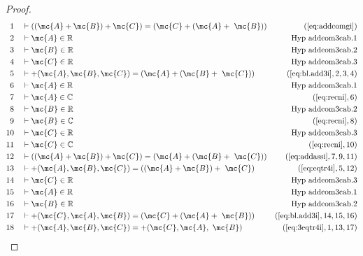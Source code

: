 \begin{proof}
\begin{align}
  1 &&  & \vdash ( ( \mc{A} + \mc{B} ) + \mc{C} ) = ( \mc{C} + ( \mc{A} +
     ~\mc{B} ) )&(\mbox{\ref{eq:addcomgi}})\notag
  \\ 2 &&  & \vdash \mc{A} \in
\mathbb{R}&\text{Hyp~addcom3cab.1}\notag%
  \\ 3 &&  & \vdash \mc{B} \in
\mathbb{R}&\text{Hyp~addcom3cab.2}\notag%
  \\ 4 &&  & \vdash \mc{C} \in
\mathbb{R}&\text{Hyp~addcom3cab.3}\notag%
  \\ 5 &&  & \vdash +( \mc{A} , \mc{B} , \mc{C} ) = ( \mc{A} + ( \mc{B} +
     ~\mc{C} ) )&(\mbox{\ref{eq:bl.add3i}},2,3,4)\notag
  \\ 6 &&  & \vdash \mc{A} \in
\mathbb{R}&\text{Hyp~addcom3cab.1}\notag%
  \\ 7 &&  & \vdash \mc{A} \in \mathbb{C}&(\mbox{\ref{eq:recni}},6)\notag
  \\ 8 &&  & \vdash \mc{B} \in
\mathbb{R}&\text{Hyp~addcom3cab.2}\notag%
  \\ 9 &&  & \vdash \mc{B} \in \mathbb{C}&(\mbox{\ref{eq:recni}},8)\notag
  \\ 10 &&  & \vdash \mc{C} \in
\mathbb{R}&\text{Hyp~addcom3cab.3}\notag%
  \\ 11 &&  & \vdash \mc{C} \in \mathbb{C}&(\mbox{\ref{eq:recni}},10)\notag
  \\ 12 &&  & \vdash ( ( \mc{A} + \mc{B} ) + \mc{C} ) = ( \mc{A} + ( \mc{B} +
     ~\mc{C} ) )&(\mbox{\ref{eq:addassi}},7,9,11)\notag
  \\ 13 &&  & \vdash +( \mc{A} , \mc{B} , \mc{C} ) = ( ( \mc{A} + \mc{B} ) +
     ~\mc{C} )&(\mbox{\ref{eq:eqtr4i}},5,12)\notag
  \\ 14 &&  & \vdash \mc{C} \in
\mathbb{R}&\text{Hyp~addcom3cab.3}\notag%
  \\ 15 &&  & \vdash \mc{A} \in
\mathbb{R}&\text{Hyp~addcom3cab.1}\notag%
  \\ 16 &&  & \vdash \mc{B} \in
\mathbb{R}&\text{Hyp~addcom3cab.2}\notag%
  \\ 17 &&  & \vdash +( \mc{C} , \mc{A} , \mc{B} ) = ( \mc{C} + ( \mc{A} +
     ~\mc{B} ) )&(\mbox{\ref{eq:bl.add3i}},14,15,16)\notag
  \\ 18 &&  & \vdash +( \mc{A} , \mc{B} , \mc{C} ) = +( \mc{C} , \mc{A} ,
     ~\mc{B} )&(\mbox{\ref{eq:3eqtr4i}},1,13,17)\notag
\end{align}
\end{proof}

